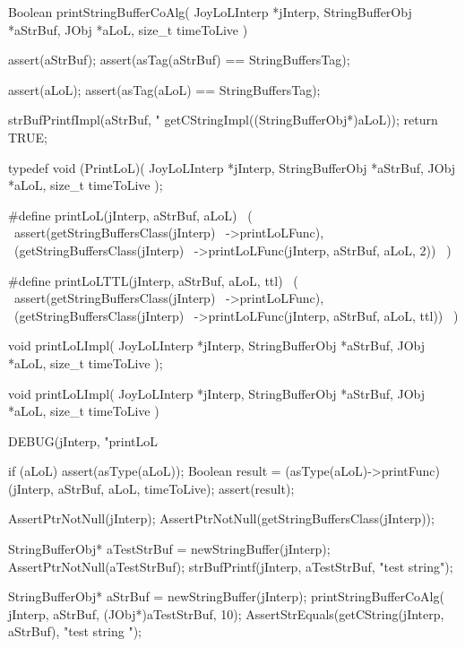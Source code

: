 \startCCode
Boolean printStringBufferCoAlg(
  JoyLoLInterp    *jInterp,
  StringBufferObj *aStrBuf,
  JObj            *aLoL,
  size_t           timeToLive
) {
  assert(aStrBuf);
  assert(asTag(aStrBuf) == StringBuffersTag);
  
  assert(aLoL);
  assert(asTag(aLoL) == StringBuffersTag);

  strBufPrintfImpl(aStrBuf, "%
    getCStringImpl((StringBufferObj*)aLoL));
  return TRUE;
}
\stopCCode

\startCHeader
typedef void (PrintLoL)(
  JoyLoLInterp    *jInterp,
  StringBufferObj *aStrBuf,
  JObj            *aLoL,
  size_t           timeToLive
);

#define printLoL(jInterp, aStrBuf, aLoL)          \ 
  (                                               \
    assert(getStringBuffersClass(jInterp)         \
      ->printLoLFunc),                            \
    (getStringBuffersClass(jInterp)               \
      ->printLoLFunc(jInterp, aStrBuf, aLoL, 2))  \
  )

#define printLoLTTL(jInterp, aStrBuf, aLoL, ttl)    \ 
  (                                                 \
    assert(getStringBuffersClass(jInterp)           \
      ->printLoLFunc),                              \
    (getStringBuffersClass(jInterp)                 \
      ->printLoLFunc(jInterp, aStrBuf, aLoL, ttl))  \
  )
\stopCHeader

\setCHeaderStream{private}
\startCHeader
void printLoLImpl(
  JoyLoLInterp    *jInterp,
  StringBufferObj *aStrBuf,
  JObj            *aLoL,
  size_t           timeToLive
);
\stopCHeader
{}

\startCCode
void printLoLImpl(
  JoyLoLInterp    *jInterp,
  StringBufferObj *aStrBuf,
  JObj            *aLoL,
  size_t           timeToLive
) {
  DEBUG(jInterp, "printLoL %

  if (aLoL) {
    assert(asType(aLoL));
    Boolean result =
      (asType(aLoL)->printFunc)
        (jInterp, aStrBuf, aLoL, timeToLive);
    assert(result);
  }
}
\stopCCode
{}

\startCTest
  AssertPtrNotNull(jInterp);
  AssertPtrNotNull(getStringBuffersClass(jInterp));

  StringBufferObj* aTestStrBuf = newStringBuffer(jInterp);
  AssertPtrNotNull(aTestStrBuf);
  strBufPrintf(jInterp, aTestStrBuf, "test string");
  
  StringBufferObj* aStrBuf = newStringBuffer(jInterp);
  printStringBufferCoAlg(
    jInterp, aStrBuf, (JObj*)aTestStrBuf, 10);
  AssertStrEquals(getCString(jInterp, aStrBuf), "test string ");
  
